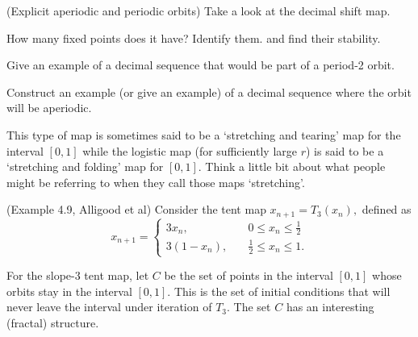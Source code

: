 \documentclass[12pt,letterpaper,noanswers]{exam}
\begin{document}
\begin{questions}


\question (Explicit aperiodic and periodic orbits) Take a look at the decimal shift map.
\begin{parts}
\item How many fixed points does it have?  Identify them. and find their stability.
\item Give an example of a decimal sequence that would be part of a period-2 orbit.
\item Construct an example (or give an example) of a decimal sequence where the orbit will be aperiodic.
\item This type of map is sometimes said to be a `stretching and tearing' map for the interval $[0,1]$ while the logistic map (for sufficiently large $r$) is said to be a `stretching and folding' map for $[0,1]$.  Think a little bit about what people might be referring to when they call those maps `stretching'.
\end{parts}

\question 
(Example 4.9, Alligood et al) Consider the tent map $x_{n+1} = T_3(x_n),$ defined as \[
x_{n+1} = \left\{
        \begin{array}{ll}
            3x_n, & \quad 0\leq x_n \leq \frac{1}{2} \\
            3(1-x_n), & \quad \frac{1}{2}\leq x_n \leq 1.
        \end{array}
    \right.
    \]
    
For the slope-3 tent map, let $C$ be the set of points in the interval $[0,1]$ whose orbits stay in the interval $[0,1]$.  This is the set of initial conditions
that will never leave the interval under iteration of $T_3$.  The set $C$ has an interesting (fractal) structure.
\end{questions}
\end{document}
